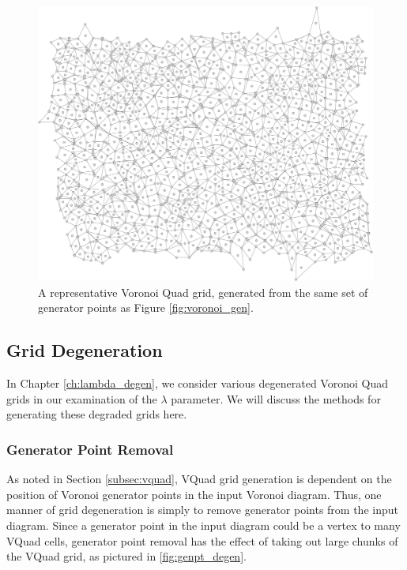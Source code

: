 \documentclass[a4paper,11pt]{report}
\begin{document}
\begin{figure}[htp]
\centering
\includegraphics[width=1.0\textwidth]{ch3_figs/vquad_stoma_v2}
\caption[Voronoi Quad Grid]{
  A representative Voronoi Quad grid, generated from the same set of generator points as Figure 
  \ref{fig:voronoi_gen}.
}
\label{fig:vquad_grid}
\end{figure}

\subsection{Grid Degeneration}
In Chapter \ref{ch:lambda_degen}, we consider various degenerated Voronoi Quad grids
in our examination of the $\lambda$ parameter. We will discuss the methods for generating these degraded grids here.

\subsubsection{Generator Point Removal}
As noted in Section \ref{subsec:vquad}, VQuad grid generation is dependent on the position of Voronoi generator points in the input Voronoi diagram. Thus, one manner of grid degeneration is simply to remove generator points from the input diagram. Since a generator point in the input diagram could be a vertex to many VQuad cells, generator point removal has the effect of taking out large chunks of the VQuad grid, as pictured in \ref{fig:genpt_degen}.
\end{document}
